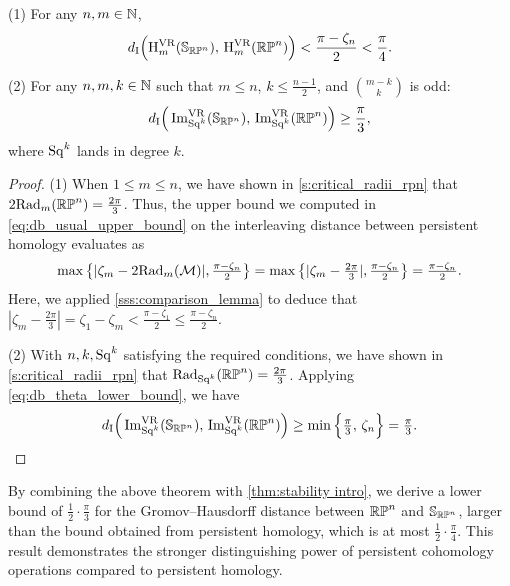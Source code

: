 \theorem
(1) For any \(n,m \in \mathbb{N}\),
\[
d_{\mathrm{I}}\Big(\mathrm{H}^{\mathrm{VR}}_m(\mathbb{S}_{\mathbb{RP}^n}),\, \mathrm{H}^{\mathrm{VR}}_m(\mathbb{RP}^n)\Big) < \frac{\pi - \zeta_n}{2} < \frac{\pi}{4}.
\]

\noindent (2) For any \(n,m,k \in \mathbb{N}\) such that \(m \leq n\), \(k \leq \tfrac{n-1}{2}\), and \(\binom{m-k}{k}\) is odd:
\[
d_{\mathrm{I}}\Big(\operatorname{Im}_{\mathrm{Sq}^k}^{\mathrm{VR}}(\mathbb{S}_{\mathbb{RP}^n}),\, \operatorname{Im}_{\mathrm{Sq}^k}^{\mathrm{VR}}(\mathbb{RP}^n)\Big) \geq \frac{\pi}{3},
\]
where $\mathrm{Sq}^k$ lands in degree \(k\).

\begin{proof}
    (1) When $1 \leq m \leq n$, we have shown in \cref{s:critical_radii_rpn} that
    $2\mathrm{Rad}_{m}(\mathbb{RP}^n) = \tfrac{2\pi}{3}$.
    Thus, the upper bound we computed in \cref{eq:db_usual_upper_bound} on the interleaving distance between persistent homology evaluates as
    \[\max\big\{|\zeta_m  - 2\mathrm{Rad}_{m}(\mathcal{M}) |, \tfrac{\pi - \zeta_n}{2}\big\} =
    \max \big\{ |\zeta_m  - \tfrac{2\pi}{3} |, \tfrac{\pi - \zeta_n}{2} \big\}
    = \tfrac{\pi - \zeta_n}{2}.
    \]
    Here, we applied \cref{sss:comparison_lemma} to deduce that $|\zeta_m  - \tfrac{2\pi}{3} | = \zeta_1 - \zeta_m < \tfrac{\pi - \zeta_1}{2} \leq \tfrac{\pi - \zeta_n}{2}$.

    (2) With $n,k,\mathrm{Sq}^k$ satisfying the required conditions, we have shown in \cref{s:critical_radii_rpn} that
	$\mathrm{Rad}_{\mathrm{Sq}^k}(\mathbb{RP}^n) = \tfrac{2\pi}{3}$.
    Applying \cref{eq:db_theta_lower_bound}, we have
	\[d_{\mathrm{I}}\Big(\operatorname{Im}_{\mathrm{Sq}^k}^{\mathrm{VR}}(\mathbb{S}_{\mathbb{RP}^n}),\, \operatorname{Im}_{\mathrm{Sq}^k}^{\mathrm{VR}}(\mathbb{RP}^n)\Big)
	\geq \min\Big\{\tfrac{\pi}{3},\, \zeta_n\Big\}
	= \tfrac{\pi}{3}.\qedhere
    \]
\end{proof}

By combining the above theorem with \cref{thm:stability intro}, we derive a lower bound of \(\frac{1}{2} \cdot \frac{\pi}{3}\) for the Gromov–Hausdorff distance between \(\mathbb{RP}^n\) and \(\mathbb{S}_{\mathbb{RP}^n}\), larger than the bound obtained from persistent homology, which is at most \(\frac{1}{2} \cdot \frac{\pi}{4}\).
This result demonstrates the stronger distinguishing power of persistent cohomology operations compared to persistent homology.